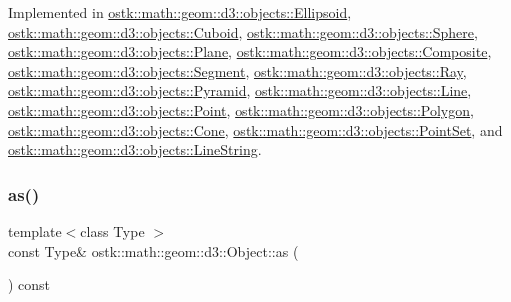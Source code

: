 Implemented in \hyperlink{classostk_1_1math_1_1geom_1_1d3_1_1objects_1_1_ellipsoid_aa7c60b942f6b1fa3a513bc3b549ab9e6}{ostk\+::math\+::geom\+::d3\+::objects\+::\+Ellipsoid}, \hyperlink{classostk_1_1math_1_1geom_1_1d3_1_1objects_1_1_cuboid_aaa90106ccf8120f854bdcf0f824e5610}{ostk\+::math\+::geom\+::d3\+::objects\+::\+Cuboid}, \hyperlink{classostk_1_1math_1_1geom_1_1d3_1_1objects_1_1_sphere_a421357bf4058e68e0aa636f606c6b249}{ostk\+::math\+::geom\+::d3\+::objects\+::\+Sphere}, \hyperlink{classostk_1_1math_1_1geom_1_1d3_1_1objects_1_1_plane_a4d96743e35df811f8c725561d353e245}{ostk\+::math\+::geom\+::d3\+::objects\+::\+Plane}, \hyperlink{classostk_1_1math_1_1geom_1_1d3_1_1objects_1_1_composite_a2d99d6b4096c2f5ba3175f886e2e2c7d}{ostk\+::math\+::geom\+::d3\+::objects\+::\+Composite}, \hyperlink{classostk_1_1math_1_1geom_1_1d3_1_1objects_1_1_segment_a5d2aba754d42c89224c7579944de9c4f}{ostk\+::math\+::geom\+::d3\+::objects\+::\+Segment}, \hyperlink{classostk_1_1math_1_1geom_1_1d3_1_1objects_1_1_ray_abdbc52aa6745f9d9601a8138a519d828}{ostk\+::math\+::geom\+::d3\+::objects\+::\+Ray}, \hyperlink{classostk_1_1math_1_1geom_1_1d3_1_1objects_1_1_pyramid_ab4f31049019c0ea4b87931adf4ba7c5d}{ostk\+::math\+::geom\+::d3\+::objects\+::\+Pyramid}, \hyperlink{classostk_1_1math_1_1geom_1_1d3_1_1objects_1_1_line_ab12eb788b966601d6d09f75196a30d6f}{ostk\+::math\+::geom\+::d3\+::objects\+::\+Line}, \hyperlink{classostk_1_1math_1_1geom_1_1d3_1_1objects_1_1_point_a0b79a5726ac04f814b8a5b737daf0028}{ostk\+::math\+::geom\+::d3\+::objects\+::\+Point}, \hyperlink{classostk_1_1math_1_1geom_1_1d3_1_1objects_1_1_polygon_abf60fe8602485822f8f07c01f6980cf5}{ostk\+::math\+::geom\+::d3\+::objects\+::\+Polygon}, \hyperlink{classostk_1_1math_1_1geom_1_1d3_1_1objects_1_1_cone_a9b783e16344d65dfba68c63d1adca3e1}{ostk\+::math\+::geom\+::d3\+::objects\+::\+Cone}, \hyperlink{classostk_1_1math_1_1geom_1_1d3_1_1objects_1_1_point_set_af03e071aa9d7a364a0c76f563b65a57e}{ostk\+::math\+::geom\+::d3\+::objects\+::\+Point\+Set}, and \hyperlink{classostk_1_1math_1_1geom_1_1d3_1_1objects_1_1_line_string_a8d1b47e4f9e314a5fc7df353c808dbc2}{ostk\+::math\+::geom\+::d3\+::objects\+::\+Line\+String}.

\mbox{\label{classostk_1_1math_1_1geom_1_1d3_1_1_object_ad921120c3bf1176035258fad0f654137}} 
\subsubsection{\texorpdfstring{as()}{as()}}
{\footnotesize\ttfamily template$<$class Type $>$ \\
const Type\& ostk\+::math\+::geom\+::d3\+::\+Object\+::as (\begin{DoxyParamCaption}{ }\end{DoxyParamCaption}) const\hspace{0.3cm}{\ttfamily [inline]}}



